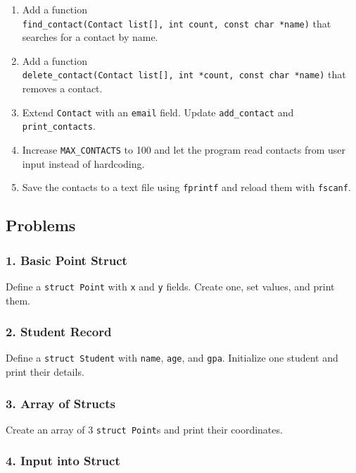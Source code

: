 \documentclass[
  letterpaper,
  DIV=11,
  numbers=noendperiod]{scrreprt}
\providecommand{\tightlist}{%
  \setlength{\itemsep}{0pt}\setlength{\parskip}{0pt}}
\begin{document}
\begin{enumerate}
\def\labelenumi{\arabic{enumi}.}
\tightlist
\item
  Add a function
  \texttt{find\_contact(Contact\ list{[}{]},\ int\ count,\ const\ char\ *name)}
  that searches for a contact by name.
\item
  Add a function
  \texttt{delete\_contact(Contact\ list{[}{]},\ int\ *count,\ const\ char\ *name)}
  that removes a contact.
\item
  Extend \texttt{Contact} with an \texttt{email} field. Update
  \texttt{add\_contact} and \texttt{print\_contacts}.
\item
  Increase \texttt{MAX\_CONTACTS} to 100 and let the program read
  contacts from user input instead of hardcoding.
\item
  Save the contacts to a text file using \texttt{fprintf} and reload
  them with \texttt{fscanf}.
\end{enumerate}

\subsection{Problems}\label{problems-6}

\subsubsection{1. Basic Point Struct}\label{basic-point-struct}

Define a \texttt{struct\ Point} with \texttt{x} and \texttt{y} fields.
Create one, set values, and print them.

\subsubsection{2. Student Record}\label{student-record}

Define a \texttt{struct\ Student} with \texttt{name}, \texttt{age}, and
\texttt{gpa}. Initialize one student and print their details.

\subsubsection{3. Array of Structs}\label{array-of-structs}

Create an array of 3 \texttt{struct\ Point}s and print their
coordinates.

\subsubsection{4. Input into Struct}\label{input-into-struct}
\end{document}
